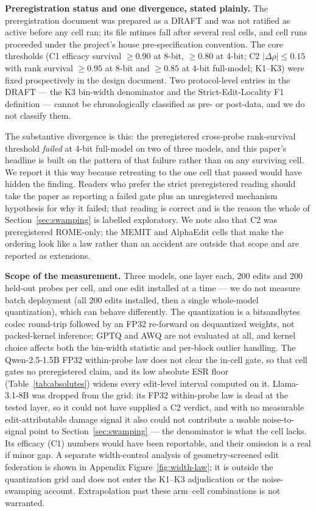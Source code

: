 \documentclass[preprint,12pt]{elsarticle}
\begin{document}
\textbf{Preregistration status and one divergence, stated plainly.} The preregistration
document was prepared as a DRAFT and was not ratified as active before any cell ran; its
file mtimes fall after several real cells, and cell runs proceeded under the project's
house pre-specification convention. The core thresholds (C1 efficacy survival
$\geq 0.90$ at 8-bit, $\geq 0.80$ at 4-bit; C2 $|\Delta\rho| \leq 0.15$ with rank
survival $\geq 0.95$ at 8-bit and $\geq 0.85$ at 4-bit full-model; K1--K3) were fixed
prospectively in the design document. Two protocol-level entries in the DRAFT --- the
K3 bin-width denominator and the Strict-Edit-Locality F1 definition --- cannot be
chronologically classified as pre- or post-data, and we do not classify them.

The substantive divergence is this: the preregistered cross-probe rank-survival
threshold \emph{failed} at 4-bit full-model on two of three models, and this paper's
headline is built on the pattern of that failure rather than on any surviving cell. We
report it this way because retreating to the one cell that passed would have hidden the
finding. Readers who prefer the strict preregistered reading should take the paper as
reporting a failed gate plus an unregistered mechanism hypothesis for why it failed;
that reading is correct and is the reason the whole of
Section~\ref{sec:swamping} is labelled exploratory. We note also that C2 was
preregistered ROME-only; the MEMIT and AlphaEdit cells that make the ordering look like
a law rather than an accident are outside that scope and are reported as extensions.

\textbf{Scope of the measurement.} Three models, one layer each, 200 edits and 200
held-out probes per cell, and one edit installed at a time --- we do not measure batch
deployment (all 200 edits installed, then a single whole-model quantization), which can
behave differently. The quantization is a bitsandbytes codec round-trip followed by an
FP32 re-forward on dequantized weights, not packed-kernel inference; GPTQ and AWQ are
not evaluated at all, and kernel choice affects both the bin-width statistic and
per-block outlier handling. The Qwen-2.5-1.5B FP32 within-probe law does not clear the
in-cell gate, so that cell gates no preregistered claim, and its low absolute ESR floor
(Table~\ref{tab:absolutes}) widens every edit-level interval computed on it. Llama-3.1-8B
was dropped from the grid: its FP32 within-probe law is dead at the tested layer, so it
could not have supplied a C2 verdict, and with no measurable edit-attributable damage
signal it also could not contribute a usable noise-to-signal point to
Section~\ref{sec:swamping} --- the denominator is what the cell lacks. Its efficacy
(C1) numbers would have been reportable, and their omission is a real if minor gap.
A separate width-control analysis of geometry-screened edit federation is shown in
Appendix Figure~\ref{fig:width-law}; it is outside the quantization grid and does not
enter the K1--K3 adjudication or the noise-swamping account.
Extrapolation past these arm--cell combinations is not warranted.
\end{document}
